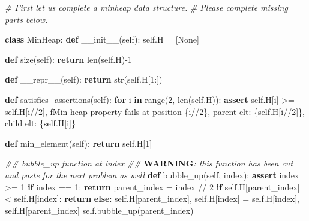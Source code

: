 \documentclass[
]{article}
\newenvironment{Shaded}{}{}
\newcommand{\AlertTok}[1]{\textcolor[rgb]{1.00,0.00,0.00}{\textbf{#1}}}
\newcommand{\BuiltInTok}[1]{\textcolor[rgb]{0.00,0.50,0.00}{#1}}
\newcommand{\CommentTok}[1]{\textcolor[rgb]{0.38,0.63,0.69}{\textit{#1}}}
\newcommand{\ControlFlowTok}[1]{\textcolor[rgb]{0.00,0.44,0.13}{\textbf{#1}}}
\newcommand{\DecValTok}[1]{\textcolor[rgb]{0.25,0.63,0.44}{#1}}
\newcommand{\FunctionTok}[1]{\textcolor[rgb]{0.02,0.16,0.49}{#1}}
\newcommand{\KeywordTok}[1]{\textcolor[rgb]{0.00,0.44,0.13}{\textbf{#1}}}
\newcommand{\NormalTok}[1]{#1}
\newcommand{\OperatorTok}[1]{\textcolor[rgb]{0.40,0.40,0.40}{#1}}
\newcommand{\SpecialCharTok}[1]{\textcolor[rgb]{0.25,0.44,0.63}{#1}}
\newcommand{\SpecialStringTok}[1]{\textcolor[rgb]{0.73,0.40,0.53}{#1}}
\newcommand{\VariableTok}[1]{\textcolor[rgb]{0.10,0.09,0.49}{#1}}
\begin{document}
\begin{Shaded}
\begin{Highlighting}[]
\CommentTok{\# First let us complete a minheap data structure.}
\CommentTok{\# Please complete missing parts below.}

\KeywordTok{class}\NormalTok{ MinHeap:}
    \KeywordTok{def} \FunctionTok{\_\_init\_\_}\NormalTok{(}\VariableTok{self}\NormalTok{):}
        \VariableTok{self}\NormalTok{.H }\OperatorTok{=}\NormalTok{ [}\VariableTok{None}\NormalTok{]}

    \KeywordTok{def}\NormalTok{ size(}\VariableTok{self}\NormalTok{):}
        \ControlFlowTok{return} \BuiltInTok{len}\NormalTok{(}\VariableTok{self}\NormalTok{.H)}\OperatorTok{{-}}\DecValTok{1}

    \KeywordTok{def} \FunctionTok{\_\_repr\_\_}\NormalTok{(}\VariableTok{self}\NormalTok{):}
        \ControlFlowTok{return} \BuiltInTok{str}\NormalTok{(}\VariableTok{self}\NormalTok{.H[}\DecValTok{1}\NormalTok{:])}

    \KeywordTok{def}\NormalTok{ satisfies\_assertions(}\VariableTok{self}\NormalTok{):}
        \ControlFlowTok{for}\NormalTok{ i }\KeywordTok{in} \BuiltInTok{range}\NormalTok{(}\DecValTok{2}\NormalTok{, }\BuiltInTok{len}\NormalTok{(}\VariableTok{self}\NormalTok{.H)):}
            \ControlFlowTok{assert} \VariableTok{self}\NormalTok{.H[i] }\OperatorTok{\textgreater{}=} \VariableTok{self}\NormalTok{.H[i}\OperatorTok{//}\DecValTok{2}\NormalTok{],  }\SpecialStringTok{f\textquotesingle{}Min heap property fails at position }\SpecialCharTok{\{}\NormalTok{i}\OperatorTok{//}\DecValTok{2}\SpecialCharTok{\}}\SpecialStringTok{, parent elt: }\SpecialCharTok{\{}\VariableTok{self}\SpecialCharTok{.}\NormalTok{H[i}\OperatorTok{//}\DecValTok{2}\NormalTok{]}\SpecialCharTok{\}}\SpecialStringTok{, child elt: }\SpecialCharTok{\{}\VariableTok{self}\SpecialCharTok{.}\NormalTok{H[i]}\SpecialCharTok{\}}\SpecialStringTok{\textquotesingle{}}

    \KeywordTok{def}\NormalTok{ min\_element(}\VariableTok{self}\NormalTok{):}
        \ControlFlowTok{return} \VariableTok{self}\NormalTok{.H[}\DecValTok{1}\NormalTok{]}

    \CommentTok{\#\# bubble\_up function at index}
    \CommentTok{\#\# }\AlertTok{WARNING}\CommentTok{: this function has been cut and paste for the next problem as well}
    \KeywordTok{def}\NormalTok{ bubble\_up(}\VariableTok{self}\NormalTok{, index):}
        \ControlFlowTok{assert}\NormalTok{ index }\OperatorTok{\textgreater{}=} \DecValTok{1}
        \ControlFlowTok{if}\NormalTok{ index }\OperatorTok{==} \DecValTok{1}\NormalTok{:}
            \ControlFlowTok{return}
\NormalTok{        parent\_index }\OperatorTok{=}\NormalTok{ index }\OperatorTok{//} \DecValTok{2}
        \ControlFlowTok{if} \VariableTok{self}\NormalTok{.H[parent\_index] }\OperatorTok{\textless{}} \VariableTok{self}\NormalTok{.H[index]:}
            \ControlFlowTok{return}
        \ControlFlowTok{else}\NormalTok{:}
            \VariableTok{self}\NormalTok{.H[parent\_index], }\VariableTok{self}\NormalTok{.H[index] }\OperatorTok{=} \VariableTok{self}\NormalTok{.H[index], }\VariableTok{self}\NormalTok{.H[parent\_index]}
            \VariableTok{self}\NormalTok{.bubble\_up(parent\_index)}


\end{Highlighting}
\end{Shaded}
\end{document}
